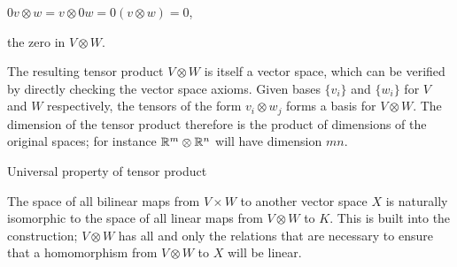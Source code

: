     $0v\otimes w=v\otimes 0w=0(v\otimes w)=0$,

the zero in $V \otimes W$.

The resulting tensor product $V \otimes W$ is itself a vector space, 
which can be verified by directly checking the vector space axioms. 
Given bases $\{v_i\}$ and $\{w_i\}$ for $V$ and $W$ respectively, 
the tensors of the form $v_i \otimes w_j$ forms a basis for $V \otimes W$. 
The dimension of the tensor product therefore is the product of dimensions 
of the original spaces; for instance ${\Bbb R}^m \otimes {\Bbb R}^n$ will have dimension $mn$.

\msk


Universal property of tensor product

The space of all bilinear maps from $V\times W$ to another vector space $X$ is naturally 
isomorphic to the space of all linear maps from $V \otimes W$ to $K$. This is built 
into the construction; $V\otimes W$ has all and only the relations that are necessary 
to ensure that a homomorphism from $V\otimes W$ to $X$ will be linear.
